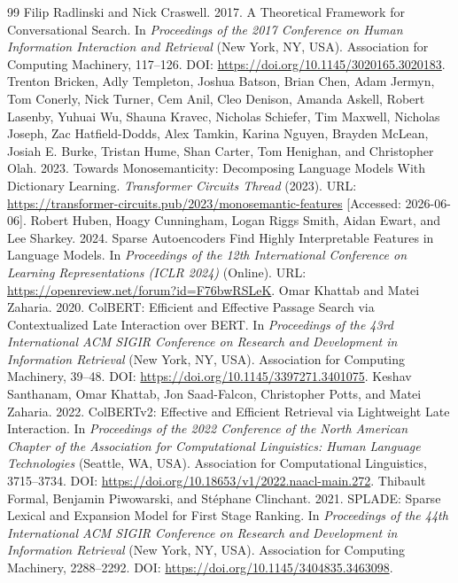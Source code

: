 \documentclass[sigconf,anonymous,screen]{acmart}
\begin{document}
\begin{thebibliography}{99}
 Filip Radlinski and Nick Craswell. 2017. A Theoretical Framework for Conversational Search. In \textit{Proceedings of the 2017 Conference on Human Information Interaction and Retrieval} (New York, NY, USA). Association for Computing Machinery, 117--126. DOI: \url{https://doi.org/10.1145/3020165.3020183}.
 Trenton Bricken, Adly Templeton, Joshua Batson, Brian Chen, Adam Jermyn, Tom Conerly, Nick Turner, Cem Anil, Cleo Denison, Amanda Askell, Robert Lasenby, Yuhuai Wu, Shauna Kravec, Nicholas Schiefer, Tim Maxwell, Nicholas Joseph, Zac Hatfield-Dodds, Alex Tamkin, Karina Nguyen, Brayden McLean, Josiah E. Burke, Tristan Hume, Shan Carter, Tom Henighan, and Christopher Olah. 2023. Towards Monosemanticity: Decomposing Language Models With Dictionary Learning. \textit{Transformer Circuits Thread} (2023). URL: \url{https://transformer-circuits.pub/2023/monosemantic-features} [Accessed: 2026-06-06].
 Robert Huben, Hoagy Cunningham, Logan Riggs Smith, Aidan Ewart, and Lee Sharkey. 2024. Sparse Autoencoders Find Highly Interpretable Features in Language Models. In \textit{Proceedings of the 12th International Conference on Learning Representations (ICLR 2024)} (Online). URL: \url{https://openreview.net/forum?id=F76bwRSLeK}.
 Omar Khattab and Matei Zaharia. 2020. ColBERT: Efficient and Effective Passage Search via Contextualized Late Interaction over BERT. In \textit{Proceedings of the 43rd International ACM SIGIR Conference on Research and Development in Information Retrieval} (New York, NY, USA). Association for Computing Machinery, 39--48. DOI: \url{https://doi.org/10.1145/3397271.3401075}.
 Keshav Santhanam, Omar Khattab, Jon Saad-Falcon, Christopher Potts, and Matei Zaharia. 2022. ColBERTv2: Effective and Efficient Retrieval via Lightweight Late Interaction. In \textit{Proceedings of the 2022 Conference of the North American Chapter of the Association for Computational Linguistics: Human Language Technologies} (Seattle, WA, USA). Association for Computational Linguistics, 3715--3734. DOI: \url{https://doi.org/10.18653/v1/2022.naacl-main.272}.
 Thibault Formal, Benjamin Piwowarski, and St\'{e}phane Clinchant. 2021. SPLADE: Sparse Lexical and Expansion Model for First Stage Ranking. In \textit{Proceedings of the 44th International ACM SIGIR Conference on Research and Development in Information Retrieval} (New York, NY, USA). Association for Computing Machinery, 2288--2292. DOI: \url{https://doi.org/10.1145/3404835.3463098}.

\end{thebibliography}
\end{document}

